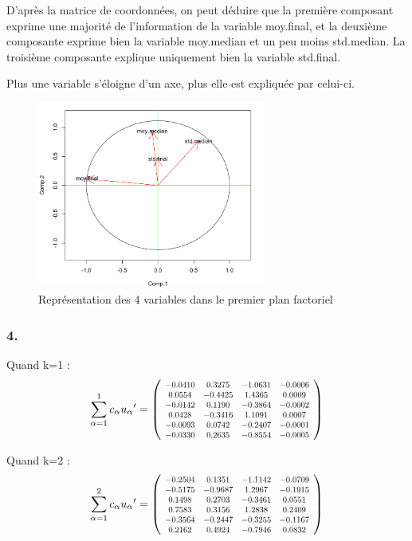 \documentclass{article}
\newcommand\scalemath[2]{\scalebox{#1}{\mbox{\ensuremath{\displaystyle #2}}}} %
\begin{document}
D'après la matrice de coordonnées, on peut déduire que la première composant exprime une majorité de l'information de la variable moy.final, et la deuxième composante exprime bien la variable moy.median et un peu moins std.median.
La troisième composante explique uniquement bien la variable std.final.

Plus une variable s'éloigne d'un axe, plus elle est expliquée par celui-ci.

\begin{figure}[H]
\centering
\includegraphics[width=7.5cm]{./img/cercle_1.png}
\caption{Représentation des 4 variables dans le premier plan factoriel}
\label{2.1.var_plot_fac}
\end{figure}
\subsubsection*{4.}
Quand k=1 :
\[
\sum_{\alpha=1}^{1}c_{\alpha}u_{\alpha}{'}=
\left(
\scalemath{0.75}{
	\begin{array}{cccc}
    -0.0410&  0.3275& -1.0631& -0.0006\\
    0.0554& -0.4425&  1.4365&  0.0009\\
    -0.0142&  0.1190& -0.3864& -0.0002\\
    0.0428& -0.3416&  1.1091&  0.0007\\
    -0.0093&  0.0742&-0.2407& -0.0001\\
    -0.0330&  0.2635& -0.8554& -0.0005\\
    \end{array}
    }
\right)   
\]

Quand k=2 :
\[
\sum_{\alpha=1}^{2}c_{\alpha}u_{\alpha}{'}=
\left(
\scalemath{0.75}{
	\begin{array}{cccc}
    -0.2504&  0.1351& -1.1142& -0.0709\\
    -0.5175& -0.9687&  1.2967& -0.1915\\
    0.1498&  0.2703& -0.3461&  0.0551\\
    0.7583&  0.3156&  1.2838&  0.2409\\
    -0.3564& -0.2447& -0.3255& -0.1167\\
    0.2162&  0.4924& -0.7946&  0.0832\\
    \end{array}
    }
\right)   
\]
\end{document}
